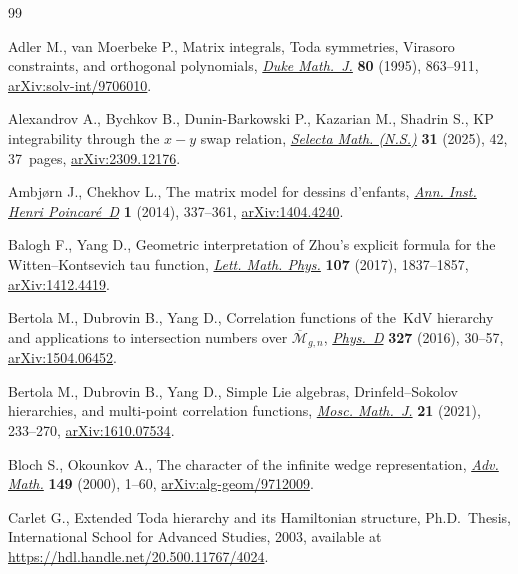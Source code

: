 \documentclass[pdftex]{sigma}
\numberwithin{equation}{section}
\begin{document}
\begin{thebibliography}{99}
\footnotesize\itemsep=0pt

Adler M., van Moerbeke P., Matrix integrals, {T}oda symmetries, {V}irasoro
 constraints, and orthogonal polynomials,
 \href{https://doi.org/10.1215/S0012-7094-95-08029-6}{\textit{Duke Math.~J.}}
 \textbf{80} (1995), 863--911,
 \href{http://arxiv.org/abs/solv-int/9706010}{arXiv:solv-int/9706010}.

Alexandrov A., Bychkov B., Dunin-Barkowski P., Kazarian M., Shadrin S., K{P}
 integrability through the {$x-y$} swap relation,
 \href{https://doi.org/10.1007/s00029-025-01035-8}{\textit{Selecta Math.
 (N.S.)}} \textbf{31} (2025), 42, 37~pages,
 \href{http://arxiv.org/abs/2309.12176}{arXiv:2309.12176}.

Ambj\o{r}n J., Chekhov L., The matrix model for dessins d'enfants,
 \href{https://doi.org/10.4171/AIHPD/10}{\textit{Ann. Inst. Henri
 Poincar\'e~D}} \textbf{1} (2014), 337--361,
 \href{http://arxiv.org/abs/1404.4240}{arXiv:1404.4240}.

Balogh F., Yang D., Geometric interpretation of {Z}hou's explicit formula for
 the {W}itten--{K}ontsevich tau function,
 \href{https://doi.org/10.1007/s11005-017-0965-8}{\textit{Lett. Math. Phys.}}
 \textbf{107} (2017), 1837--1857,
 \href{http://arxiv.org/abs/1412.4419}{arXiv:1412.4419}.

Bertola M., Dubrovin B., Yang D., Correlation functions of the~{K}d{V}
 hierarchy and applications to intersection numbers over
 {$\overline{\mathcal{M}}_{g,n}$},
 \href{https://doi.org/10.1016/j.physd.2016.04.008}{\textit{Phys.~D}}
 \textbf{327} (2016), 30--57,
 \href{http://arxiv.org/abs/1504.06452}{arXiv:1504.06452}.

Bertola M., Dubrovin B., Yang D., Simple {L}ie algebras, {D}rinfeld--{S}okolov
 hierarchies, and multi-point correlation functions,
 \href{https://doi.org/10.17323/1609-4514-2021-21-2-233-270}{\textit{Mosc.
 Math.~J.}} \textbf{21} (2021), 233--270,
 \href{http://arxiv.org/abs/1610.07534}{arXiv:1610.07534}.

Bloch S., Okounkov A., The character of the infinite wedge representation,
 \href{https://doi.org/10.1006/aima.1999.1845}{\textit{Adv. Math.}}
 \textbf{149} (2000), 1--60,
 \href{http://arxiv.org/abs/alg-geom/9712009}{arXiv:alg-geom/9712009}.

Carlet G., Extended {T}oda hierarchy and its {H}amiltonian structure, Ph.D.~Thesis, {I}nternational School for Advanced Studies, 2003, available at
 \url{https://hdl.handle.net/20.500.11767/4024}.


\end{thebibliography}
\end{document}

